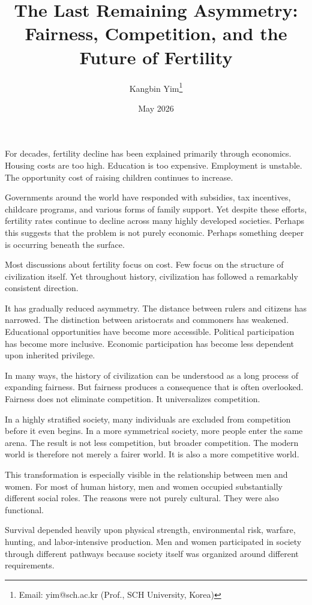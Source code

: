\documentclass[12pt]{article}
\title{The Last Remaining Asymmetry:\\Fairness, Competition, and the Future of Fertility}
\author{Kangbin Yim\thanks{Email: yim@sch.ac.kr (Prof., SCH University, Korea)}}
\date{May 2026}
\begin{document}
\maketitle

For decades, fertility decline has been explained primarily through economics.
Housing costs are too high. Education is too expensive. Employment is unstable.
The opportunity cost of raising children continues to increase. 

Governments around the world have responded with subsidies, tax incentives, childcare programs, and various forms of family support. Yet despite these efforts, fertility rates continue to decline across many highly developed societies. Perhaps this suggests that the problem is not purely economic. Perhaps something deeper is occurring beneath the surface. 

Most discussions about fertility focus on cost. Few focus on the structure of civilization itself. Yet throughout history, civilization has followed a remarkably consistent direction.

It has gradually reduced asymmetry. The distance between rulers and citizens has narrowed. The distinction between aristocrats and commoners has weakened.
Educational opportunities have become more accessible. Political participation has become more inclusive. Economic participation has become less dependent upon inherited privilege.

In many ways, the history of civilization can be understood as a long process of expanding fairness. But fairness produces a consequence that is often overlooked. Fairness does not eliminate competition. It universalizes competition.

In a highly stratified society, many individuals are excluded from competition before it even begins. In a more symmetrical society, more people enter the same arena. The result is not less competition, but broader competition. The modern world is therefore not merely a fairer world. It is also a more competitive world.

This transformation is especially visible in the relationship between men and women. For most of human history, men and women occupied substantially different social roles. The reasons were not purely cultural. They were also functional.

Survival depended heavily upon physical strength, environmental risk, warfare, hunting, and labor-intensive production. Men and women participated in society through different pathways because society itself was organized around different requirements. 
\end{document}
